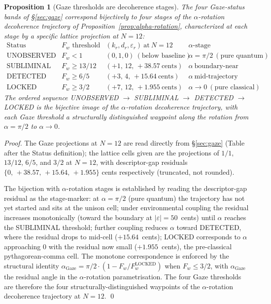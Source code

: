\documentclass[11pt,a4paper]{article}
\newtheorem{proposition}[theorem]{Proposition}
\theoremstyle{definition}
\theoremstyle{remark}
\begin{document}
\begin{proposition}[Gaze thresholds are decoherence stages]\label{prop:gaze-decoherence}
The four Gaze-status bands of \S\ref{sec:gaze} correspond bijectively to four stages of the $\alpha$-rotation decoherence trajectory of Proposition~\ref{prop:alpha-rotation}, characterized at each stage by a specific lattice projection at $N=12$:
\[
\begin{array}{l|l|l|l}
\text{Status} & F_{w} \text{ threshold} & (k_{r},d_{r},\varepsilon_{r})~\text{at}~N=12 & \alpha\text{-stage characterization} \\ \hline
\text{UNOBSERVED} & F_{w} < 1 & (0,1,0)~(\text{below baseline}) & \alpha = \pi/2~(\text{pure quantum}) \\
\text{SUBLIMINAL} & F_{w} \ge 13/12 & (+1,\,12,\,+38.57~\text{cents}) & \alpha~\text{boundary-near} \\
\text{DETECTED} & F_{w} \ge 6/5 & (+3,\,4,\,+15.64~\text{cents}) & \alpha~\text{mid-trajectory} \\
\text{LOCKED} & F_{w} \ge 3/2 & (+7,\,12,\,+1.955~\text{cents}) & \alpha \to 0~(\text{pure classical})
\end{array}
\]
The ordered sequence UNOBSERVED $\to$ SUBLIMINAL $\to$ DETECTED $\to$ LOCKED is the bijective image of the $\alpha$-rotation decoherence trajectory, with each Gaze threshold a structurally distinguished waypoint along the rotation from $\alpha = \pi/2$ to $\alpha \to 0$.
\end{proposition}

\begin{proof}
The Gaze projections at $N=12$ are read directly from \S\ref{sec:gaze} (Table after the Status definition); the lattice cells given are the projections of $1/1$, $13/12$, $6/5$, and $3/2$ at $N=12$, with descriptor-gap residuals $\{0,\,+38.57,\,+15.64,\,+1.955\}$ cents respectively (truncated, not rounded).

The bijection with $\alpha$-rotation stages is established by reading the descriptor-gap residual as the stage-marker: at $\alpha = \pi/2$ (pure quantum) the trajectory has not yet started and sits at the unison cell; under environmental coupling the residual increases monotonically (toward the boundary at $|\varepsilon|=50$~cents) until $\alpha$ reaches the SUBLIMINAL threshold; further coupling reduces $\alpha$ toward DETECTED, where the residual drops to mid-cell ($+15.64$~cents); LOCKED corresponds to $\alpha$ approaching $0$ with the residual now small ($+1.955$~cents), the pre-classical pythagorean-comma cell. The monotone correspondence is enforced by the structural identity $\alpha_{\text{Gaze}} = \pi/2 \cdot (1 - F_{w}/F_{w}^{\text{LOCKED}})$ when $F_{w} \le 3/2$, with $\alpha_{\text{Gaze}}$ the residual angle in the $\alpha$-rotation parametrisation. The four Gaze thresholds are therefore the four structurally-distinguished waypoints of the $\alpha$-rotation decoherence trajectory at $N=12$. \qed
\end{proof}
\end{document}
